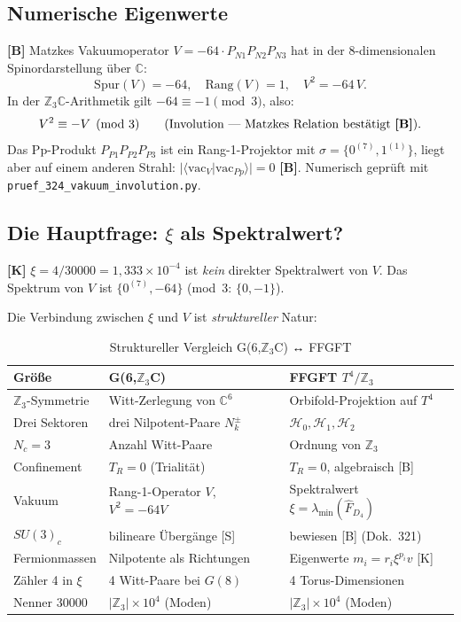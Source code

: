 \subsection{Numerische Eigenwerte}

\textbf{[B]} Matzkes Vakuumoperator $V = -64\cdot P_{N1}P_{N2}P_{N3}$
hat in der 8-dimensionalen Spinordarstellung über $\mathbb{C}$:
\begin{equation}
  \mathrm{Spur}(V) = -64, \quad \mathrm{Rang}(V) = 1, \quad V^2 = -64\,V.
\end{equation}
In der $\mathbb{Z}_3\mathbb{C}$-Arithmetik gilt $-64 \equiv -1 \pmod{3}$, also:
\begin{equation}
  V^2 \equiv -V \pmod{3} \qquad \text{(Involution — Matzkes Relation bestätigt \textbf{[B]})}.
\end{equation}
Das Pp-Produkt $P_{P1}P_{P2}P_{P3}$ ist ein Rang-1-Projektor mit
$\sigma = \{0^{(7)}, 1^{(1)}\}$, liegt aber auf einem anderen Strahl:
$|\langle\mathrm{vac}_V|\mathrm{vac}_{Pp}\rangle| = 0$ \textbf{[B]}.
Numerisch geprüft mit \texttt{pruef\_324\_vakuum\_involution.py}.

\subsection{Die Hauptfrage: $\xi$ als Spektralwert?}

\textbf{[K]} $\xi = 4/30000 = 1{,}333\times10^{-4}$ ist \emph{kein}
direkter Spektralwert von $V$. Das Spektrum von $V$ ist $\{0^{(7)}, -64\}$ (mod~3: $\{0, -1\}$).

Die Verbindung zwischen $\xi$ und $V$ ist \emph{struktureller} Natur:

\begin{table}[h]
\centering
\caption{Struktureller Vergleich G(6,$\mathbb{Z}_3$C) ↔ FFGFT}
\label{tab:vergleich}
\begin{tabular}{lll}
\toprule
Größe & G(6,$\mathbb{Z}_3$C) & FFGFT $T^4/\mathbb{Z}_3$ \\
\midrule
$\mathbb{Z}_3$-Symmetrie & Witt-Zerlegung von $\mathbb{C}^6$ & Orbifold-Projektion auf $T^4$ \\
Drei Sektoren & drei Nilpotent-Paare $N_k^\pm$ & $\mathcal{H}_0, \mathcal{H}_1, \mathcal{H}_2$ \\
$N_c = 3$ & Anzahl Witt-Paare & Ordnung von $\mathbb{Z}_3$ \\
Confinement & $T_R = 0$ (Trialität) & $T_R = 0$, algebraisch [B] \\
Vakuum & Rang-1-Operator $V$, $V^2=-64V$ & Spektralwert $\xi = \lambda_{\min}(\hat{F}_{D_4})$ \\
$SU(3)_c$ & bilineare Übergänge [S] & bewiesen [B] (Dok.~321) \\
Fermionmassen & Nilpotente als Richtungen & Eigenwerte $m_i = r_i\xi^{p_i}v$ [K] \\
Zähler 4 in $\xi$ & 4 Witt-Paare bei $G(8)$ & 4 Torus-Dimensionen \\
Nenner 30000 & $|\mathbb{Z}_3|\times10^4$ (Moden) & $|\mathbb{Z}_3|\times10^4$ (Moden) \\
\bottomrule
\end{tabular}
\end{table}


